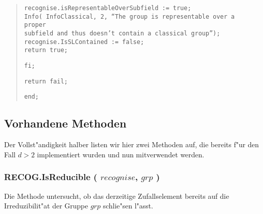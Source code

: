 \documentclass[a4paper,11pt]{article}
\theoremstyle{bla}
\begin{document}
\begin{quote}
    \hspace*{0.3cm} \texttt{recognise.isRepresentableOverSubfield := true;}\\
    \hspace*{0.3cm} \texttt{Info( InfoClassical, 2, ``The group is representable over a proper}\\
    \hspace*{0.3cm} \texttt{subfield and thus doesn't contain a classical group'');}\\
    \hspace*{0.3cm} \texttt{recognise.IsSLContained := false;}\\
    \hspace*{0.3cm} \texttt{return true;}

  \texttt{fi;}


  \texttt{return fail;}

\hspace*{-0.3cm} \texttt{end;}
\end{quote}


\subsection{Vorhandene Methoden}

Der Vollst"andigkeit halber listen wir hier zwei Methoden auf, die bereits f"ur den Fall $d > 2$ implementiert wurden und nun mitverwendet werden.


\subsubsection{RECOG.IsReducible ( $recognise$, $grp$ )}\label{redu}

Die Methode untersucht, ob das derzeitige Zufallselement bereits auf die Irreduzibilit"at der Gruppe $grp$ schlie"sen l"asst.
\end{document}
